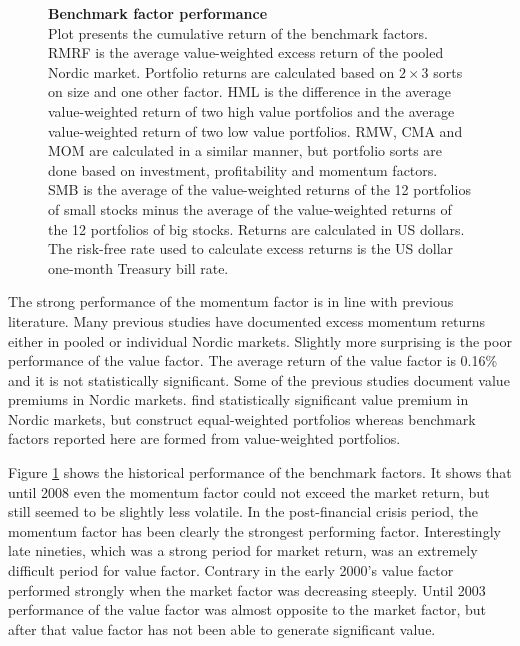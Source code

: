 \documentclass[12pt]{article}
\begin{document}
\begin{figure}[ht]
\centering
\caption[Benchmark factor performance]{\textbf{Benchmark factor performance}\\ Plot presents the cumulative return of the benchmark factors. RMRF is the average value-weighted excess return of the pooled Nordic market. Portfolio returns are calculated based on $2 \times 3$ sorts on size and one other factor. HML is the difference in the average value-weighted return of two high value portfolios and the average value-weighted return of two low value portfolios. RMW, CMA and MOM are calculated in a similar manner, but portfolio sorts are done based on investment, profitability and momentum factors. SMB is the average of the value-weighted returns of the 12 portfolios of small stocks minus the average of the value-weighted returns of the 12 portfolios of big stocks. Returns are calculated in US dollars. The risk-free rate used to calculate excess returns is the US dollar one-month Treasury bill rate.}

\label{plot:factor_performance}
\end{figure}

The strong performance of the momentum factor is in line with previous literature. Many previous studies have documented excess momentum returns either in pooled or individual Nordic markets.\footnotemark {} Slightly more surprising is the poor performance of the value factor. The average return of the value factor is 0.16\% and it is not statistically significant. Some of the previous studies document value premiums in Nordic markets. \citet{grobys} find statistically significant value premium in Nordic markets, but \citeauthor{grobys} construct equal-weighted portfolios whereas benchmark factors reported here are formed from value-weighted portfolios.\footnotemark {} \par

Figure \ref{plot:factor_performance} shows the historical performance of the benchmark factors. It shows that until 2008 even the momentum factor could not exceed the market return, but still seemed to be slightly less volatile. In the post-financial crisis period, the momentum factor has been clearly the strongest performing factor. Interestingly late nineties, which was a strong period for market return, was an extremely difficult period for value factor. Contrary in the early 2000's value factor performed strongly when the market factor was decreasing steeply. Until 2003 performance of the value factor was almost opposite to the market factor, but after that value factor has not been able to generate significant value. \par
\end{document}
